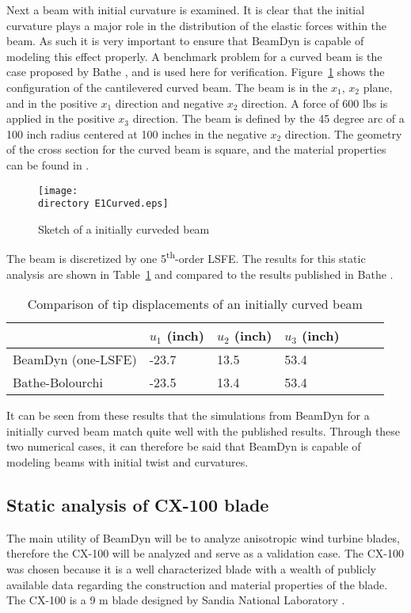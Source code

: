 \documentclass{aiaa-tc}
\def\directory{EPSF/}
\begin{document}
Next a beam with initial curvature is examined. It is clear that the initial curvature plays a major role in the distribution of the elastic forces within the beam. As such it is very important to ensure that BeamDyn is capable of modeling this effect properly. A benchmark problem for a curved beam is the case proposed by Bathe \cite{Bathe1979}, and is used here for verification. Figure~\ref{E1Curved} shows the configuration of the cantilevered curved beam. The beam is in the $x_1$, $x_2$ plane, and in the positive $x_1$ direction and negative $x_2$ direction. A force of 600 lbs is applied in the positive $x_3$ direction. The beam is defined by the 45 degree arc of a 100 inch radius centered at 100 inches in the negative $x_2$ direction.  The geometry of the cross section for the curved beam is square, and the material properties can be found in \cite{Bathe1979}. 
\begin{figure}
\centering
\texttt{[image: \\directory E1Curved.eps]}
\caption{Sketch of a initially curveded beam} 
\label{E1Curved}
\end{figure}
The beam is discretized by one 5\textsuperscript{th}-order LSFE. The results for this static analysis are shown in Table~\ref{E1CurvedDisp} and compared to the results published in Bathe \cite{Bathe1979}.

\begin{table}
\caption{\label{E1CurvedDisp} Comparison of tip displacements of an initially curved beam } 
\begin{center}
    \begin{tabular}{| l | l | l | l | l | l | l |}
    	\hline
    	        & $u_1$ (inch) & $u_2$ (inch) & $u_3$ (inch)  \\ \hline
    	BeamDyn (one-LSFE) & -23.7     & 13.5       & 53.4      \\  \hline
    	Bathe-Bolourchi \cite{Bathe1979}   & -23.5     & 13.4       & 53.4     \\ \hline
    \end{tabular}
\end{center}
\end{table} 

It can be seen from these results that the simulations from BeamDyn for a initially curved beam match quite well with the published results. Through these two numerical cases, it can therefore be said that BeamDyn is capable of modeling beams with initial twist and curvatures.

\subsection{Static analysis of CX-100 blade}
The main utility of BeamDyn will be to analyze anisotropic wind turbine blades, therefore the CX-100 will be analyzed and serve as a validation case. The CX-100 was chosen because it is a well characterized blade with a wealth of publicly available data regarding the construction and material properties of the blade. The CX-100 is a 9 m blade designed by Sandia National Laboratory \cite{paquette2006modeling}.
\end{document}
